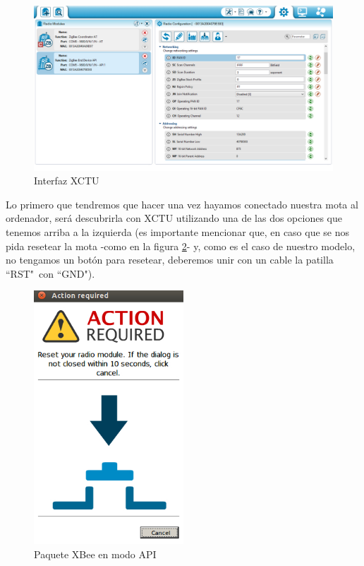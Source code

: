 \begin{figure}[!htb]
\centering
\includegraphics[width=1\textwidth]{./imagenes/interfaz1}
\caption{Interfaz XCTU} \label{fig:interfaz1}
\end{figure}

Lo primero que tendremos que hacer una vez hayamos conectado nuestra mota al ordenador, será descubrirla con XCTU
utilizando una de las dos opciones que tenemos arriba a la izquierda (es importante mencionar que, en caso que se nos
pida resetear la mota -como en la figura \ref{fig:xctureset}- y, como es el caso de nuestro modelo, no tengamos un botón para resetear, deberemos unir con un
cable la patilla ``RST"\ con ``GND").\\

\begin{figure}[!htb]
\centering
\includegraphics[width=0.5\textwidth]{./imagenes/xctureset}
\caption{Paquete XBee en modo API} \label{fig:xctureset}
\end{figure}

